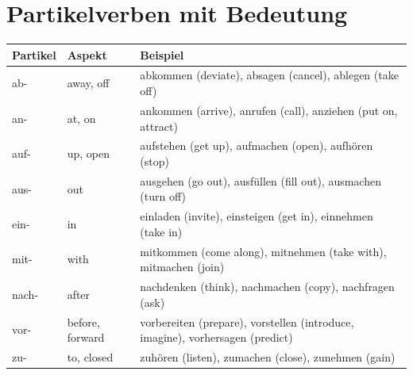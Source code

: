 \section{Partikelverben mit Bedeutung}
\label{sec:Partikelbedeutung}

\bigskip
\begin{center}
\begin{tabular}{|l|l|p{7cm}|}
\hline
Partikel & Aspekt & Beispiel \\ \hline
ab- & away, off & \begin{minipage}{7cm}abkommen (deviate), absagen (cancel), ablegen (take off)\end{minipage} \\ \hline
an- & at, on & \begin{minipage}{7cm}ankommen (arrive), anrufen (call), anziehen (put on, attract)\end{minipage} \\ \hline
auf- & up, open & \begin{minipage}{7cm}aufstehen (get up), aufmachen (open), aufhören (stop)\end{minipage} \\ \hline
aus- & out & \begin{minipage}{7cm}ausgehen (go out), ausfüllen (fill out), ausmachen (turn off)\end{minipage} \\ \hline
ein- & in & \begin{minipage}{7cm}einladen (invite), einsteigen (get in), einnehmen (take in)\end{minipage} \\ \hline
mit- & with & \begin{minipage}{7cm}mitkommen (come along), mitnehmen (take with), mitmachen (join)\end{minipage} \\ \hline
nach- & after & \begin{minipage}{7cm}nachdenken (think), nachmachen (copy), nachfragen (ask)\end{minipage} \\ \hline
vor- & before, forward & \begin{minipage}{7cm}vorbereiten (prepare), vorstellen (introduce, imagine), vorhersagen (predict)\end{minipage} \\ \hline
zu- & to, closed & \begin{minipage}{7cm}zuhören (listen), zumachen (close), zunehmen (gain)\end{minipage} \\ \hline

\end{tabular}
\end{center}

